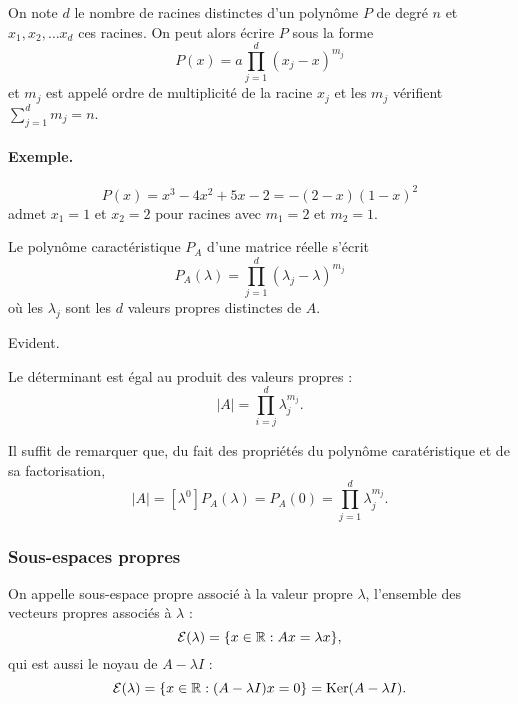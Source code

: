 \begin{definition}
  On note $d$ le nombre de racines distinctes d'un polynôme $P$ de degré $n$ et $x_1, x_2, \dots x_d$ ces racines. On peut alors écrire $P$ sous la forme
  $$
  P(x) = a \prod_{j=1}^d (x_j - x)^{m_j}
  $$
  et $m_j$ est appelé ordre de multiplicité de la racine $x_j$ et les $m_j$ vérifient $ \sum_{j=1}^d m_j = n$.
\end{definition}

\paragraph*{Exemple.} 
$$
P(x) = x^3 - 4x^2 + 5x - 2 = - (2-x)(1-x)^2
$$ 
admet $x_1 = 1$ et $x_2 = 2$ pour racines avec $m_1 = 2$ et $m_2 = 1$.


\begin{corollary*}
  Le polynôme caractéristique $P_A$ d'une matrice réelle s'écrit
  $$
  P_A(\lambda) = \prod_{j=1}^d (\lambda_j - \lambda)^{m_j}
  $$
  où les $\lambda_j$ sont les $d$ valeurs propres distinctes de $A$.
\end{corollary*}

\proof
Evident.\eproof

\begin{corollary*}
  Le déterminant est égal au produit des valeurs propres : 
  $$
  |A| = \prod_{i=j}^d \lambda_j^{m_j}.
  $$
\end{corollary*}

\proof
  Il suffit de remarquer que, du fait des propriétés du polynôme caratéristique et de sa factorisation, 
  $$
  |A| = [\lambda^0]P_A(\lambda) = P_A(0) = \prod_{j=1}^d \lambda_j^{m_j}.
  $$
\eproof

\subsubsection{Sous-espaces propres} 

\begin{definition}
  On appelle sous-espace propre associé à la valeur propre $\lambda$, l'ensemble des vecteurs propres associés à $\lambda$ :
  $$
  \mathcal{E}(\lambda) = \{x \in \mathbb{R}: Ax = \lambda x\},
  $$
  qui est aussi le noyau de $A - \lambda I$ : 
  $$
  \mathcal{E}(\lambda) = \{x \in \mathbb{R}: (A - \lambda I)x = 0\} = \text{Ker}(A - \lambda I).
  $$
\end{definition}

